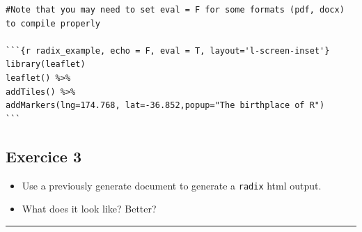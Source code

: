 \documentclass[]{article}
\begin{document}
\begin{verbatim}
#Note that you may need to set eval = F for some formats (pdf, docx) to compile properly

```{r radix_example, echo = F, eval = T, layout='l-screen-inset'}  
library(leaflet)  
leaflet() %>%  
addTiles() %>%   
addMarkers(lng=174.768, lat=-36.852,popup="The birthplace of R")  
```    
\end{verbatim}

\hypertarget{exercice-3}{%
\subsection{Exercice 3}\label{exercice-3}}

\begin{itemize}
\item
  Use a previously generate document to generate a \texttt{radix} html
  output.
\item
  What does it look like? Better?
\end{itemize}

\begin{center}\rule{0.5\linewidth}{\linethickness}\end{center}
\end{document}

